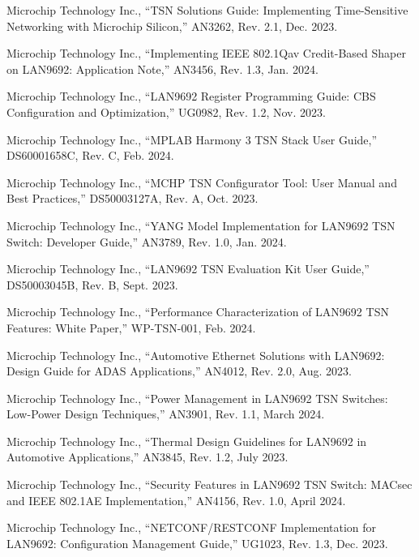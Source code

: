 \documentclass[10pt, journal, compsoc]{IEEEtran}
\begin{document}
\begin{thebibliography}{99}
Microchip Technology Inc., ``TSN Solutions Guide: Implementing Time-Sensitive Networking with Microchip Silicon,'' AN3262, Rev. 2.1, Dec. 2023.

Microchip Technology Inc., ``Implementing IEEE 802.1Qav Credit-Based Shaper on LAN9692: Application Note,'' AN3456, Rev. 1.3, Jan. 2024.

Microchip Technology Inc., ``LAN9692 Register Programming Guide: CBS Configuration and Optimization,'' UG0982, Rev. 1.2, Nov. 2023.

Microchip Technology Inc., ``MPLAB Harmony 3 TSN Stack User Guide,'' DS60001658C, Rev. C, Feb. 2024.

Microchip Technology Inc., ``MCHP TSN Configurator Tool: User Manual and Best Practices,'' DS50003127A, Rev. A, Oct. 2023.

Microchip Technology Inc., ``YANG Model Implementation for LAN9692 TSN Switch: Developer Guide,'' AN3789, Rev. 1.0, Jan. 2024.

Microchip Technology Inc., ``LAN9692 TSN Evaluation Kit User Guide,'' DS50003045B, Rev. B, Sept. 2023.

Microchip Technology Inc., ``Performance Characterization of LAN9692 TSN Features: White Paper,'' WP-TSN-001, Feb. 2024.

Microchip Technology Inc., ``Automotive Ethernet Solutions with LAN9692: Design Guide for ADAS Applications,'' AN4012, Rev. 2.0, Aug. 2023.

Microchip Technology Inc., ``Power Management in LAN9692 TSN Switches: Low-Power Design Techniques,'' AN3901, Rev. 1.1, March 2024.

Microchip Technology Inc., ``Thermal Design Guidelines for LAN9692 in Automotive Applications,'' AN3845, Rev. 1.2, July 2023.

Microchip Technology Inc., ``Security Features in LAN9692 TSN Switch: MACsec and IEEE 802.1AE Implementation,'' AN4156, Rev. 1.0, April 2024.

Microchip Technology Inc., ``NETCONF/RESTCONF Implementation for LAN9692: Configuration Management Guide,'' UG1023, Rev. 1.3, Dec. 2023.


\end{thebibliography}
\end{document}

